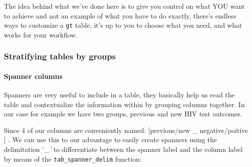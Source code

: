 \documentclass[
]{article}
\begin{document}
The idea behind what we've done here is to give you control on what YOU
want to achieve and not an example of what you have to do exactly,
there's endless ways to customize a \texttt{gt} table, it's up to you to
choose what you need, and what works for your workflow.

\hypertarget{stratifying-tables-by-groups}{%
\subsubsection{Stratifying tables by
groups}\label{stratifying-tables-by-groups}}

\hypertarget{spanner-columns}{%
\paragraph{Spanner columns}\label{spanner-columns}}

Spanners are very useful to include in a table, they basically help us
read the table and contextualize the information within by grouping
columns together. In our case for example we have two groups, previous
and new HIV test outcomes.

Since 4 of our columns are conveniently named: {[}previous/new \_
negative/poitive {]} \emph{.} We can use this to our advantage to easily
create spanners using the delimitation '\_\emph{'} to differentiate
between the spanner label and the column label by means of the
\emph{\texttt{tab}}\texttt{\_spanner\_delim} function:
\end{document}
